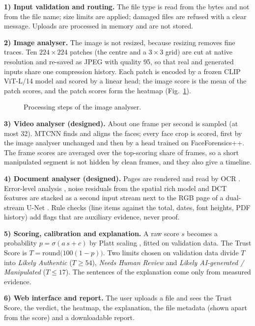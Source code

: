 \documentclass[12pt,a4paper]{article}
\begin{document}
\textbf{1) Input validation and routing.} The file type is read from the bytes and not from the file name; size limits are applied; damaged files are refused with a clear message. Uploads are processed in memory and are not stored.

\textbf{2) Image analyser.} The image is not resized, because resizing removes fine traces. Ten $224\times224$ patches (the centre and a $3\times3$ grid) are cut at native resolution and re-saved as JPEG with quality 95, so that real and generated inputs share one compression history. Each patch is encoded by a frozen CLIP ViT-L/14 model and scored by a linear head; the image score is the mean of the patch scores, and the patch scores form the heatmap (Fig.~\ref{fig:pipe}).

\begin{figure}[htbp]
  \centering
  
  \caption{Processing steps of the image analyser.}\label{fig:pipe}
\end{figure}

\textbf{3) Video analyser (designed).} About one frame per second is sampled (at most 32). MTCNN \cite{mtcnn} finds and aligns the faces; every face crop is scored, first by the image analyser unchanged and then by a head trained on FaceForensics++. The frame scores are averaged over the top-scoring share of frames, so a short manipulated segment is not hidden by clean frames, and they also give a timeline.

\textbf{4) Document analyser (designed).} Pages are rendered and read by OCR \cite{tesseract}. Error-level analysis \cite{krawetz}, noise residuals from the spatial rich model \cite{fridrich} and DCT features are stacked as a second input stream next to the RGB page of a dual-stream U-Net \cite{unet,zhou}. Rule checks (line items against the total, dates, font heights, PDF history) add flags that are auxiliary evidence, never proof.

\textbf{5) Scoring, calibration and explanation.} A raw score $s$ becomes a probability $p=\sigma(a\,s+c)$ by Platt scaling \cite{platt}, fitted on validation data. The Trust Score is $T=\mathrm{round}\bigl(100(1-p)\bigr)$. Two limits chosen on validation data divide $T$ into \emph{Likely Authentic} ($T\ge 54$), \emph{Needs Human Review} and \emph{Likely AI-generated / Manipulated} ($T\le 17$). The sentences of the explanation come only from measured evidence.

\textbf{6) Web interface and report.} The user uploads a file and sees the Trust Score, the verdict, the heatmap, the explanation, the file metadata (shown apart from the score) and a downloadable report.
\end{document}

